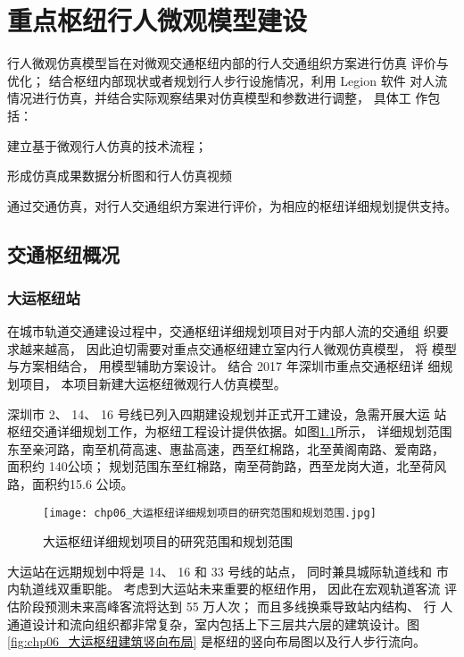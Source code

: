 

\chapter{重点枢纽行人微观模型建设}
行人微观仿真模型旨在对微观交通枢纽内部的行人交通组织方案进行仿真
评价与优化； 结合枢纽内部现状或者规划行人步行设施情况，利用 Legion 软件
对人流情况进行仿真，并结合实际观察结果对仿真模型和参数进行调整， 具体工
作包括：

\begin{cit}
\item 建立基于微观行人仿真的技术流程；
\item 形成仿真成果数据分析图和行人仿真视频
\item 通过交通仿真，对行人交通组织方案进行评价，为相应的枢纽详细规划提供支持。
\end{cit}

\section{交通枢纽概况}
\subsection{大运枢纽站}
在城市轨道交通建设过程中，交通枢纽详细规划项目对于内部人流的交通组
织要求越来越高， 因此迫切需要对重点交通枢纽建立室内行人微观仿真模型， 将
模型与方案相结合， 用模型辅助方案设计。 结合 2017 年深圳市重点交通枢纽详
细规划项目， 本项目新建大运枢纽微观行人仿真模型。

深圳市 2、 14、 16 号线已列入四期建设规划并正式开工建设，急需开展大运
站枢纽交通详细规划工作，为枢纽工程设计提供依据。如图\ref{fig:chp06_大运枢纽详细规划项目的研究范围和规划范围}所示，
详细规划范围东至亲河路，南至机荷高速、惠盐高速，西至红棉路，北至黄阁南路、爱南路，
面积约 140公顷； 规划范围东至红棉路，南至荷韵路，西至龙岗大道，北至荷风路，面积约15.6 公顷。

\begin{figure}[!ht]
  \centering
  \texttt{[image: chp06\_大运枢纽详细规划项目的研究范围和规划范围.jpg]}
  \caption{大运枢纽详细规划项目的研究范围和规划范围\label{fig:chp06_大运枢纽详细规划项目的研究范围和规划范围} }
\end{figure}

大运站在远期规划中将是 14、 16 和 33 号线的站点， 同时兼具城际轨道线和
市内轨道线双重职能。 考虑到大运站未来重要的枢纽作用， 因此在宏观轨道客流
评估阶段预测未来高峰客流将达到 55 万人次； 而且多线换乘导致站内结构、 行
人通道设计和流向组织都非常复杂，室内包括上下三层共六层的建筑设计。图\ref{fig:chp06_大运枢纽建筑竖向布局}
是枢纽的竖向布局图以及行人步行流向。

